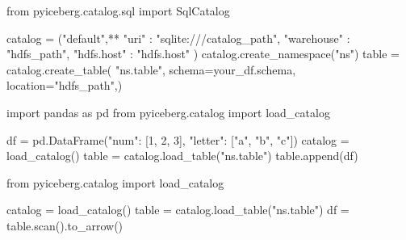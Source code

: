 \begin{minipage}{\textwidth}
    \begin{python}[caption={[Instanciate Iceberg catalog with SQLite] Instanciating an Iceberg catalog using SQLite}, label={lst:ch4_instanciate_catalog}, basicstyle=\small]
    from pyiceberg.catalog.sql import SqlCatalog

    catalog = ("default",**{
            "uri" : "sqlite:///catalog_path",
            "warehouse" : "hdfs_path", 
            "hdfs.host" : "hdfs.host" }) 
    catalog.create_namespace("ns")
    table = catalog.create_table(
                    "ns.table", 
                    schema=your_df.schema,
                    location="hdfs_path",)
    \end{python}
\end{minipage}
\medskip


\begin{minipage}{\textwidth}
    \begin{python}[caption={[Writing with IcedHops] Writing a DataFrame with IcedHops on an Iceberg Table stored on \gls{HopsFS} (or \gls{HDFS}).}, label={lst:ch4_iceberg_write}, basicstyle=\small]
    import pandas as pd
    from pyiceberg.catalog import load_catalog

    df = pd.DataFrame({"num": [1, 2, 3], 
                       "letter": ["a", "b", "c"]})
    catalog = load_catalog()
    table   = catalog.load_table("ns.table")
    table.append(df)
    \end{python}
\end{minipage}
\medskip


\begin{minipage}{\textwidth}
    \begin{python}[caption={[Reading with IcedHops] Reading a table with IcedHops from an Iceberg Table stored on \gls{HopsFS} (or \gls{HDFS}).}, label={lst:ch4_iceberg_read}, basicstyle=\small]
    from pyiceberg.catalog import load_catalog

    catalog = load_catalog()
    table   = catalog.load_table("ns.table")
    df      = table.scan().to_arrow()
    \end{python}
\end{minipage}
\medskip